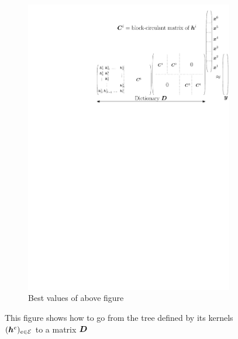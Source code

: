\begin{figure}[!ht]
\begin{subfigure}[b]{0.69\textwidth}
\includegraphics[width=\textwidth]{figures/pov-matrix.pdf}
\caption{Best values of above figure}
\end{subfigure}
\caption{This figure shows how to go from the tree defined by its kernels $(\bm{h}^e)_{e \in \mathcal E}$ to a matrix $\bm{D}$} \label{fig_block_circular}
\end{figure}

\clearpage

